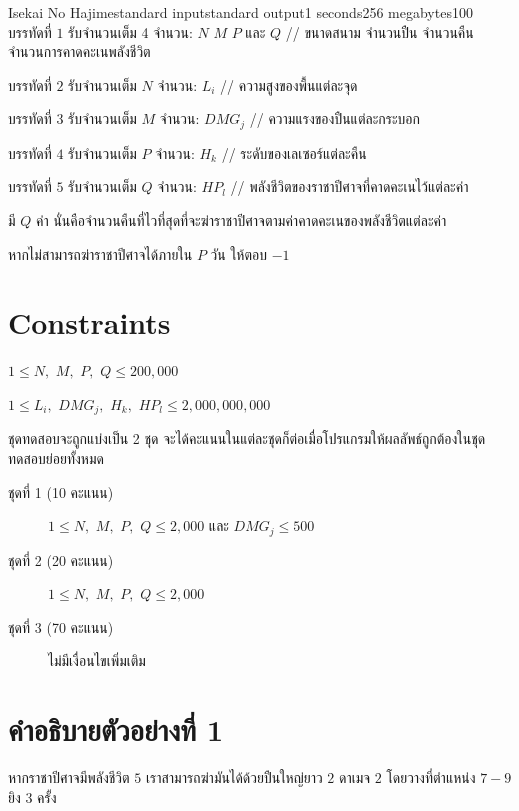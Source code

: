 \documentclass[11pt,a4paper]{article}
\begin{document}
\begin{problem}{Isekai No Hajime}{standard input}{standard output}{1 seconds}{256 megabytes}{100}
\InputFile
บรรทัดที่ $1$ รับจำนวนเต็ม 4 จำนวน: $N$ $M$ $P$ และ $Q$ // ขนาดสนาม จำนวนปืน จำนวนคืน จำนวนการคาดคะเนพลังชีวิต

บรรทัดที่ $2$ รับจำนวนเต็ม $N$ จำนวน: $L_i$ // ความสูงของพื้นแต่ละจุด

บรรทัดที่ $3$ รับจำนวนเต็ม $M$ จำนวน: $DMG_j$ // ความแรงของปืนแต่ละกระบอก

บรรทัดที่ $4$ รับจำนวนเต็ม $P$ จำนวน: $H_k$ // ระดับของเลเซอร์แต่ละคืน

บรรทัดที่ $5$ รับจำนวนเต็ม $Q$ จำนวน: $HP_l$ // พลังชีวิตของราชาปีศาจที่คาดคะเนไว้แต่ละค่า

\OutputFile
มี $Q$ ค่า นั่นคือจำนวนคืนที่ไวที่สุดที่จะฆ่าราชาปีศาจตามค่าคาดคะเนของพลังชีวิตแต่ละค่า

หากไม่สามารถฆ่าราชาปีศาจได้ภายใน $P$ วัน ให้ตอบ $-1$

\section*{Constraints}

$1 \leq N,$ $M,$ $P,$ $Q \leq 200,000$

$1 \leq L_i,$ $DMG_j,$ $H_k,$ $HP_l \leq 2,000,000,000$
  
\Scoring
ชุดทดสอบจะถูกแบ่งเป็น 2 ชุด จะได้คะแนนในแต่ละชุดก็ต่อเมื่อโปรแกรมให้ผลลัพธ์ถูกต้องในชุดทดสอบย่อยทั้งหมด

\begin{description}

\item[ชุดที่ 1 (10 คะแนน)]  $1 \leq N,$ $M,$ $P,$ $Q \leq 2,000$  และ $DMG_j \leq 500$

\item[ชุดที่ 2 (20 คะแนน)]  $1 \leq N,$ $M,$ $P,$ $Q \leq 2,000$

\item[ชุดที่ 3 (70 คะแนน)] ไม่มีเงื่อนไขเพิ่มเติม

\end{description}

\Examples

\begin{example}
%
%
\end{example}

\section*{คำอธิบายตัวอย่างที่ 1}
หากราชาปีศาจมีพลังชีวิต $5$ เราสามารถฆ่ามันได้ด้วยปืนใหญ่ยาว $2$ ดาเมจ $2$ โดยวางที่ตำแหน่ง $7 - 9$ ยิง $3$ ครั้ง


\end{problem}
\end{document}
